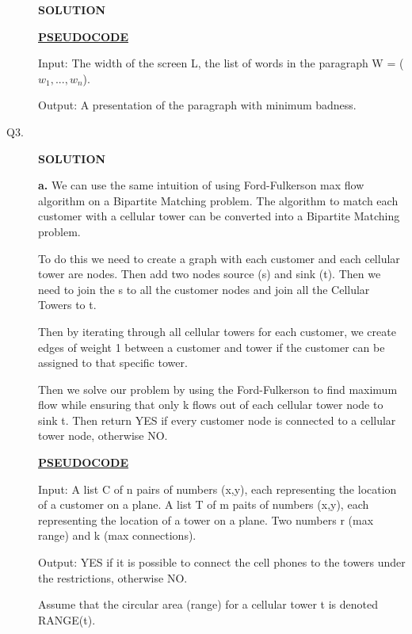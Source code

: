 \documentclass[11pt]{csc_assignment}
\begin{document}
\begin{description}
\textbf{SOLUTION}


\underline{\textbf{PSEUDOCODE}}

Input: The width of the screen L, the list of words in the paragraph W = ($w_1, ..., w_n$).

Output: A presentation of the paragraph with minimum badness.



\newpage
\item[Q3.]


\textbf{SOLUTION}

\textbf{a.} We can use the same intuition of using Ford-Fulkerson max flow algorithm on a Bipartite Matching problem. The algorithm to match each customer with a cellular tower can be converted into a Bipartite Matching problem.

To do this we need to create a graph with each customer and each cellular tower are nodes. Then add two nodes source (s) and sink (t). Then we need to join the s to all the customer nodes and join all the Cellular Towers to t.

Then by iterating through all cellular towers for each customer, we create edges of weight 1 between a customer and tower if the customer can be assigned to that specific tower.

Then we solve our problem by using the Ford-Fulkerson to find maximum flow while ensuring that only k flows out of each cellular tower node to sink t. Then return YES if every customer node is connected to a cellular tower node, otherwise NO.

\underline{\textbf{PSEUDOCODE}}

Input: A list C of n pairs of numbers (x,y), each representing the location of a customer on a plane. A list T of m paits of numbers (x,y), each representing the location of a tower on a plane. Two numbers r (max range) and k (max connections).

Output: YES if it is possible to connect the cell phones to the towers under the restrictions, otherwise NO.

Assume that the circular area (range) for a cellular tower t is denoted RANGE(t).

\clearpage


\end{description}
\end{document}
